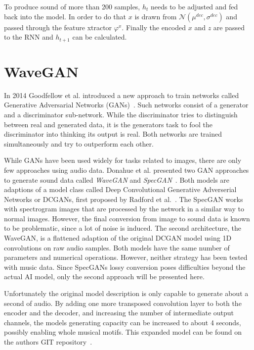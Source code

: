 \documentclass[12pt]{article}
\begin{document}
To produce sound of more than 200 samples, $h_t$ needs to be adjusted and fed back into the model.
In order to do that $x$ is drawn from $\mathcal{N}(\mu^{dec}, \sigma^{dec})$ and passed through the feature xtractor $\varphi^x$.
Finally the encoded $x$ and $z$ are passed to the RNN and $h_{t+1}$ can be calculated.












\section{WaveGAN}
In 2014 Goodfellow et al. introduced a new approach to train networks called Generative Adversarial Networks (GANs)~\cite{goodfellow2014generative}.
Such networks consist of a generator and a discriminator sub-network.
While the discriminator tries to distinguish between real and generated data, it is the generators task to fool the discriminator into thinking its output is real.
Both networks are trained simultaneously and try to outperform each other.

While GANs have been used widely for tasks related to images, there are only few approaches using audio data.
Donahue et al. presented two GAN approaches to generate sound data called \emph{WaveGAN} and \emph{SpecGAN}~\cite{donahue2018adversarial}.
Both models are adaptions of a model class called Deep Convolutional Generative Adverserial Networks or DCGANs, first proposed by Radford et al.~\cite{radford2015unsupervised}.
The SpecGAN works with spectrogram images that are processed by the network in a similar way to normal images.
However, the final conversion from image to sound data is known to be problematic, since a lot of noise is induced.
The second architecture, the WaveGAN, is a flattened adaption of the original DCGAN model using 1D convolutions on raw audio samples.
Both models have the same number of parameters and numerical operations.
However, neither strategy has been tested with music data.
Since SpecGANs lossy conversion poses difficulties beyond the actual AI model, only the second approach will be presented here.

Unfortunately the original model description is only capable to generate about a second of audio.
By adding one more transposed convolution layer to both the encoder and the decoder, and increasing the number of intermediate output channels, the models generating capacity can be increased to about 4 seconds, possibly enabling whole musical motifs. 
This expanded model can be found on the authors GIT repository~\cite{donahue2019wavegan}.
\end{document}
